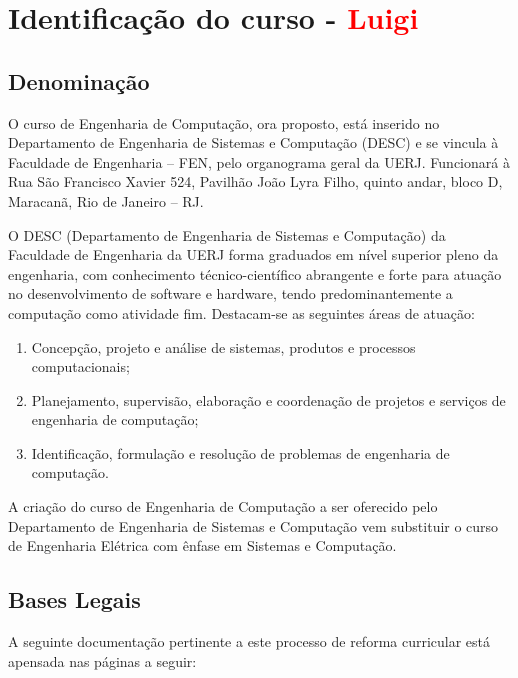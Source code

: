 \chapter{Identificação do curso - \textcolor{red}{Luigi}}

\section{Denominação}

O curso de Engenharia de Computação, ora proposto, está inserido no Departamento de Engenharia de Sistemas e Computação (DESC) e se vincula à Faculdade de Engenharia – FEN, pelo organograma geral da UERJ. Funcionará à Rua São Francisco Xavier 524, Pavilhão João Lyra Filho, quinto andar, bloco D, Maracanã, Rio de Janeiro – RJ.

O DESC (Departamento de Engenharia de Sistemas e Computação) da Faculdade de Engenharia da UERJ forma graduados em nível superior pleno da engenharia, com conhecimento técnico-científico abrangente e forte para atuação no desenvolvimento de software e hardware, tendo predominantemente a computação como atividade fim. Destacam-se as seguintes áreas de atuação:

\begin{enumerate}
	\item Concepção, projeto e análise de sistemas, produtos e processos computacionais;
	\item Planejamento, supervisão, elaboração e coordenação de projetos e serviços de engenharia de computação;
	\item Identificação, formulação e resolução de problemas de engenharia de computação.
\end{enumerate}

A criação do curso de Engenharia de Computação a ser oferecido pelo Departamento de Engenharia de Sistemas e Computação vem substituir o curso de Engenharia Elétrica com ênfase em Sistemas e Computação.

\section{Bases Legais}

A seguinte documentação pertinente a este processo de reforma curricular está apensada nas páginas a seguir:

